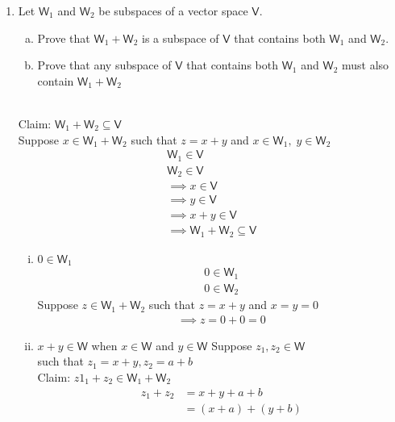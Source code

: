 \documentclass[letterpaper,12pt]{article}
\newcommand{\?}{\stackrel{?}{=}}
\begin{document}
\begin{spacing}{1.5}
\begin{enumerate}
\newpage{}
\setcounter{enumi}{22}
\item Let $\mathsf{W}_1$ and $\mathsf{W}_2$ be subspaces of a vector
  space $\mathsf{V}$.
\begin{enumerate}[(a)]
\item Prove that $\mathsf{W}_1 + \mathsf{W}_2$ is a subspace of
  $\mathsf{V}$ that contains both $\mathsf{W}_1$ and $\mathsf{W}_2$.
\item Prove that any subspace of $\mathsf{V}$ that contains both
  $\mathsf{W}_1$ and $\mathsf{W}_2$ must also contain $\mathsf{W}_1 +
  \mathsf{W}_2$ 
\end{enumerate}
\\
Claim: $\mathsf{W}_1 + \mathsf{W}_2 \subseteq \mathsf{V}$
\\
Suppose $x \in \mathsf{W}_1 + \mathsf{W}_2$ such that $z = x + y $ and
$x \in \mathsf{W}_1, \; y  \in \mathsf{W}_2$
\begin{align}
\mathsf{W}_1 \in \mathsf{V}\\
\mathsf{W}_2 \in \mathsf{V}\\
\implies x \in \mathsf{V} \\
 \implies y \in \mathsf{V}\\
\implies x + y \in \mathsf{V}\\
\implies \mathsf{W}_1 + \mathsf{W}_2 \subseteq \mathsf{V}
\end{align}
\begin{enumerate}[(i)]
\item $0 \in \mathsf{W}_1$
\begin{align}
0 \in \mathsf{W}_1\\
0 \in \mathsf{W}_2
\end{align}
Suppose $z \in \mathsf{W}_1 + \mathsf{W}_2$ such that $z = x+y$ and
$x=y=0$ 
\begin{align}
\implies z = 0 + 0 =0
\end{align}
\item $x + y \in \mathsf{W}$ when $ x \in \mathsf{W}$ and $y \in
  \mathsf{W}$
Suppose $z_1,z_2 \in \mathsf{W}$ \\such that $z_1 = x +  y,z_2  =  a +
b$\\
Claim: $z1_1 + z_2 \in \mathsf{W}_1  + \mathsf{W}_2$
\begin{align}
z_1 + z_2 &= x+ y + a+b\\
&= \left(x+a\right) + \left(y+b\right)
\end{align}
\begin{align}

\end{align}
\end{enumerate}
\end{enumerate}
\end{spacing}
\end{document}
